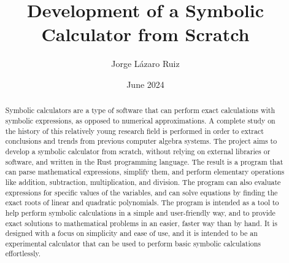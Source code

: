 \documentclass[en]{uc3mthesisIEEE}
\title{Development of a Symbolic Calculator from Scratch}
\author{Jorge Lázaro Ruiz}
\date{June 2024}
\begin{document}
  \makecover



  \begin{abstract}
    Symbolic calculators are a type of software that can perform exact calculations with symbolic expressions, as opposed to numerical approximations. A complete study on the history of this relatively young research field is performed in order to extract conclusions and trends from previous computer algebra systems. The project aims to develop a symbolic calculator from scratch, without relying on external libraries or software, and written in the Rust programming language. The result is a program that can parse mathematical expressions, simplify them, and perform elementary operations like addition, subtraction, multiplication, and division. The program can also evaluate expressions for specific values of the variables, and can solve equations by finding the exact roots of linear and quadratic polynomials. The program is intended as a tool to help perform symbolic calculations in a simple and user-friendly way, and to provide exact solutions to mathematical problems in an easier, faster way than by hand. It is designed with a focus on simplicity and ease of use, and it is intended to be an experimental calculator that can be used to perform basic symbolic calculations effortlessly.
  \end{abstract}




  \tableofcontents
  \listoffigures
  \listoftables
  \lstlistoflistings


  \begin{thesis}
  \end{thesis}

  \cleardoublepage
  \label{bibliography}
  \printbibliography[heading=bibintoc]

  \cleardoublepage
  \label{glossary}
	\printglossaries


\end{document}
